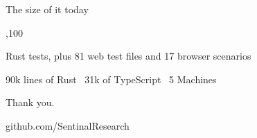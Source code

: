 \documentclass[aspectratio=169,11pt]{beamer}
\begin{document}
\begin{frame}{The size of it today}
\vfill
{\srdisplay\fontsize{80}{80},100\par}
\vspace{4mm}
{\large Rust tests, plus 81 web test files and 17 browser scenarios\par}
\vspace{2mm}
{\small\ttfamily 90k lines of Rust \textperiodcentered\ 31k of TypeScript \textperiodcentered\ 5 Machines\par}
\vfill
\end{frame}

\begin{frame}[plain]
\vfill
\sentinalmark[40pt]\par\vspace{8mm}
{\srdisplay\fontsize{34}{36}\selectfont Thank you.\par}
\vspace{4mm}
{\ttfamily{}github.com/SentinalResearch\par}
\vfill
\end{frame}
\end{document}
